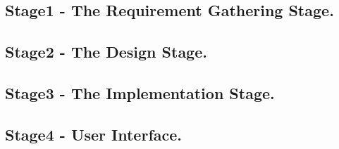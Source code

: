 \documentclass[10pt,conference]{IEEEtran}
\begin{document}
\subsection{Stage1 - The Requirement Gathering Stage. }\label{sec:1.	Requirement Gathering Stage. }



\subsection{Stage2 - The Design Stage. }\label{sec: 2:The Design Stage.}


\subsection{Stage3 - The Implementation Stage. }\label{sec: 3 The Implementation Stage.}


\subsection{Stage4 -	User Interface. }\label{sec: 4.	User Interface.}



%
%
\end{document}
